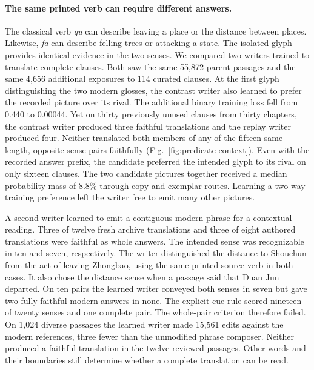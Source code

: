 \documentclass[12pt,a4paper]{article}
\providecommand{\DIFadd}[1]{{\protect\color{blue} \sf #1}} %
\begin{document}
\paragraph{\DIFadd{The same printed verb can require different answers.}}
\DIFadd{The classical verb \emph{qu} can describe leaving a place or the distance between places. Likewise, \emph{fa} can describe felling trees or attacking a state. The isolated glyph provides identical evidence in the two senses. We compared two writers trained to translate complete clauses. Both saw the same 55,872 parent passages and the same 4,656 additional exposures to 114 curated clauses. At the first glyph distinguishing the two modern glosses, the contrast writer also learned to prefer the recorded picture over its rival. The additional binary training loss fell from 0.440 to 0.00044. Yet on thirty previously unused clauses from thirty chapters, the contrast writer produced three faithful translations and the replay writer produced four. Neither translated both members of any of the fifteen same-length, opposite-sense pairs faithfully (Fig.~\ref{fig:predicate-context}). Even with the recorded answer prefix, the candidate preferred the intended glyph to its rival on only sixteen clauses. The two candidate pictures together received a median probability mass of 8.8\% through copy and exemplar routes. Learning a two-way training preference left the writer free to emit many other pictures.
}

\DIFadd{A second writer learned to emit a contiguous modern phrase for a contextual reading. Three of twelve fresh archive translations and three of eight authored translations were faithful as whole answers. The intended sense was recognizable in ten and seven, respectively. The writer distinguished the distance to Shouchun from the act of leaving Zhongbao, using the same printed source verb in both cases. It also chose the distance sense when a passage said that Duan Jun departed. On ten pairs the learned writer conveyed both senses in seven but gave two fully faithful modern answers in none. The explicit cue rule scored nineteen of twenty senses and one complete pair. The whole-pair criterion therefore failed. On 1,024 diverse passages the learned writer made 15,561 edits against the modern references, three fewer than the unmodified phrase composer. Neither produced a faithful translation in the twelve reviewed passages. Other words and their boundaries still determine whether a complete translation can be read.
}
\end{document}

